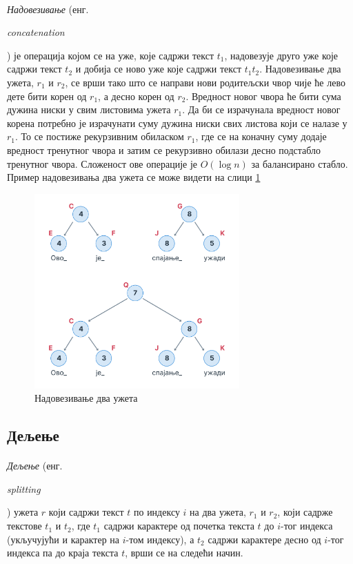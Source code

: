 \documentclass[12pt,oneside]{memoir}
\begin{document}
\paragraph{}
\emph{Надовезивање} (енг. \begin{latinica}\textit{concatenation}\end{latinica}) је
операција којом се на уже, које садржи текст \(t_1\), надовезује друго уже које садржи
текст \(t_2\) и добија се ново уже које садржи текст \(t_1t_2\). Надовезивање два ужета, \(r_1\) и \(r_2\), се врши тако што се направи нови родитељски чвор чије ће лево дете бити
корен од \(r_1\), а десно корен од  \(r_2\). Вредност новог чвора ће бити сума дужина
ниски у свим листовима ужета \(r_1\). Да би се израчунала вредност новог корена потребно је
израчунати суму дужина ниски свих листова који се налазе у \(r_1\). То се постиже
рекурзивним обиласком \(r_1\), где се на коначну суму додаје вредност тренутног чвора и
затим се рекурзивно обилази десно подстабло тренутног чвора. Сложеност ове 
операције је \(O(\log{}n)\) за балансирано стабло. Пример надовезивања два 
ужета се може видети на слици \ref{fig:rope_concat}

\begin{figure}
  \centering
  \includegraphics[width=0.7\textwidth]{images/rope_concat_1.png}
  \caption{Надовезивање два ужета}
  \label{fig:rope_concat}
\end{figure}

\subsection{Дељење}
\paragraph{}
\emph{Дељење} (енг. \begin{latinica}\textit{splitting}\end{latinica}) ужета \(r\) који
садржи текст \(t\) по
индексу \(i\) на два ужета, \(r_1\) и \(r_2\), који садрже текстове \(t_1\) и \(t_2\),
где \(t_1\) садржи карактере од почетка текста \(t\) до \(i\)-тог индекса (укључујући и
карактер на \(i\)-том индексу), а \(t_2\) садржи карактере десно од \(i\)-тог индекса па
до краја текста \(t\), врши се на следећи начин.
\end{document}
